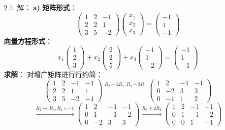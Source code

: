 \begin{exer}


2.1. 解：
\textbf{a)}
\textbf{矩阵形式}：
$$ \begin{pmatrix} 1 & 2 & -1 \\ 2 & 2 & 1 \\ 3 & 5 & -2 \end{pmatrix} \begin{pmatrix} x_1 \\ x_2 \\ x_3 \end{pmatrix} = \begin{pmatrix} -1 \\ 1 \\ -1 \end{pmatrix} $$
\textbf{向量方程形式}：
$$ x_1 \begin{pmatrix} 1 \\ 2 \\ 3 \end{pmatrix} + x_2 \begin{pmatrix} 2 \\ 2 \\ 5 \end{pmatrix} + x_3 \begin{pmatrix} -1 \\ 1 \\ -2 \end{pmatrix} = \begin{pmatrix} -1 \\ 1 \\ -1 \end{pmatrix} $$
\textbf{求解}：
对增广矩阵进行行约简：
$$ \left(\begin{array}{ccc|c} 1 & 2 & -1 & -1 \\ 2 & 2 & 1 & 1 \\ 3 & 5 & -2 & -1 \end{array}\right) \xrightarrow{R_2-2R_1, R_3-3R_1} \left(\begin{array}{ccc|c} 1 & 2 & -1 & -1 \\ 0 & -2 & 3 & 3 \\ 0 & -1 & 1 & 2 \end{array}\right) $$
$$ \xrightarrow{R_2 \leftrightarrow R_3, R_2 \times -1} \left(\begin{array}{ccc|c} 1 & 2 & -1 & -1 \\ 0 & 1 & -1 & -2 \\ 0 & -2 & 3 & 3 \end{array}\right) \xrightarrow{R_3+2R_2} \left(\begin{array}{ccc|c} 1 & 2 & -1 & -1 \\ 0 & 1 & -1 & -2 \\ 0 & 0 & 1 & -1 \end{array}\right) $$

\end{exer}

